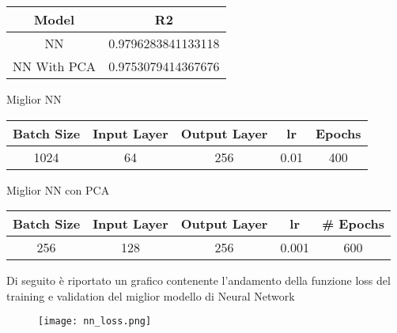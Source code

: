 \documentclass[../../Report.tex]{subfiles}
\begin{document}
\begin{table}[H]
    \centering
    \begin{tabular}{|c|c|}
        \hline
        \textbf{Model} & \textbf{R2} \\
        \hline
        NN      & 0.9796283841133118       \\
        NN With PCA    & 0.9753079414367676       \\
        \hline
    \end{tabular} 
    \label{tab:neural_network_results_2}
\end{table}
Miglior NN
\begin{table}[H]
    \centering
    \begin{tabular}{|c|c|c|c|c|}
        \hline
        \textbf{Batch Size} & \textbf{Input Layer}  & \textbf{Output Layer} & \textbf{lr} & \textbf{Epochs} \\
        \hline
        1024                & 64                   & 256                   & 0.01          & 400   \\
        \hline
    \end{tabular}
    
    \label{tab:best_nn}
\end{table}

Miglior NN con PCA
\begin{table}[H]
    \centering
    \begin{tabular}{|c|c|c|c|c|}
        \hline
        \textbf{Batch Size} & \textbf{Input Layer}  & \textbf{Output Layer} & \textbf{lr} & \textbf{\# Epochs} \\
        \hline
        256                & 128                   & 256                   & 0.001          & 600   \\
        \hline
    \end{tabular}
    
    \label{tab:best_nn_pca}
\end{table}

Di seguito è riportato un grafico contenente l'andamento della funzione loss del training e validation del miglior modello di Neural Network
\begin{figure}[H]
    \texttt{[image: nn\_loss.png]}
    \centering
\end{figure}
\end{document}
